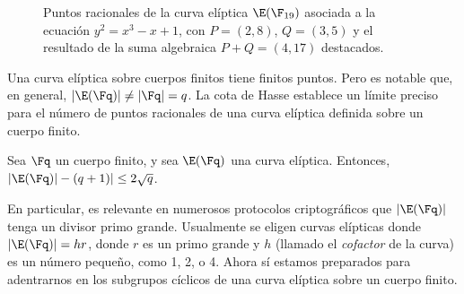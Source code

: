 \begin{figure}[ht]
	\centering
	\caption{Puntos racionales de la curva elíptica $\E(\F_{19})$ asociada a la ecuación $y^2 = x^3 - x + 1$, con $P=(2,8)$, $Q=(3,5)$ y el resultado de la suma algebraica $P+Q=(4,17)$ destacados.}
	\label{fig:curva-eliptica-f19-suma}
\end{figure}

Una curva elíptica sobre cuerpos finitos tiene finitos puntos. Pero es notable que, en general, $|\E(\Fq)| \neq |\Fq| = q$. La cota de Hasse establece un límite preciso para el número de puntos racionales de una curva elíptica definida sobre un cuerpo finito.

\begin{theorem}
	Sea $\Fq$ un cuerpo finito, y sea $\E(\Fq)$ una curva elíptica. Entonces, $|\E(\Fq)| - (q + 1)| \leq 2\sqrt{q}$.
\end{theorem}

En particular, es relevante en numerosos protocolos criptográficos que $|\E(\Fq)|$ tenga un divisor primo grande. Usualmente se eligen curvas elípticas donde $|\E(\Fq)| = hr$, donde $r$ es un primo grande y $h$ (llamado el \textit{cofactor} de la curva) es un número pequeño, como 1, 2, o 4. Ahora sí estamos preparados para adentrarnos en los subgrupos cíclicos de una curva elíptica sobre un cuerpo finito.

